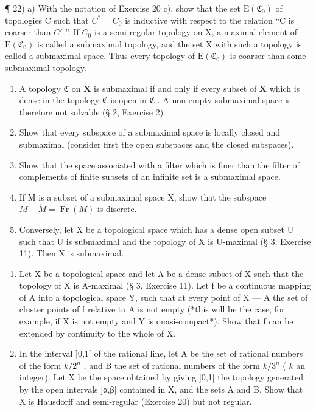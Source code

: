 ¶ 22) a) With the notation of Exercise 20 c), show that the set \(\mathrm{E}(\mathfrak{C}_{0})\) of topologies C such that \(C^{*}=C_{0}\) is inductive with respect to the relation ``C is coarser than \(C'\) ''. If \(C_{0}\) is a semi-regular topology on X, a maximal element of \(\mathrm{E}(\mathfrak{C}_{0})\) is called a submaximal topology, and the set X with such a topology is called a submaximal space. Thus every topology of \(\mathrm{E}(\mathfrak{C}_{0})\) is coarser than some submaximal topology.

\begin{enumerate}
\def\labelenumi{\alph{enumi})}
\setcounter{enumi}{1}
\item
  A topology \(\mathfrak{C}\) on \(\mathbf{X}\) is submaximal if and only if every subset of \(\mathbf{X}\) which is dense in the topology \(\mathfrak{C}\) is open in \(\mathfrak{C}\) . A non-empty submaximal space is therefore not solvable (§ 2, Exercise 2).
\item
  Show that every subspace of a submaximal space is locally closed and submaximal (consider first the open subspaces and the closed subspaces).
\item
  Show that the space associated with a filter which is finer than the filter of complements of finite subsets of an infinite set is a submaximal space.
\item
  If M is a subset of a submaximal space X, show that the subspace \(\overline{M} - \mathring{M} = \operatorname{Fr}(M)\) is discrete.
\item
  Conversely, let X be a topological space which has a dense open subset U such that U is submaximal and the topology of X is U-maximal (§ 3, Exercise 11). Then X is submaximal.
\end{enumerate}

\begin{enumerate}
\def\labelenumi{\arabic{enumi})}
\setcounter{enumi}{22}
\item
  Let X be a topological space and let A be a dense subset of X such that the topology of X is A-maximal (§ 3, Exercise 11). Let f be a continuous mapping of A into a topological space Y, such that at every point of X --- A the set of cluster points of f relative to A is not empty (*this will be the case, for example, if X is not empty and Y is quasi-compact*). Show that f can be extended by continuity to the whole of X.
\item
  In the interval {]}0,1{[} of the rational line, let A be the set of rational numbers of the form \(k/2^n\) , and B the set of rational numbers of the form \(k/3^n\) ( \(k\) an integer). Let X be the space obtained by giving {]}0,1{[} the topology generated by the open intervals {]}α,β{[} contained in X, and the sets A and B. Show that X is Hausdorff and semi-regular (Exercise 20) but not regular.
\end{enumerate}


